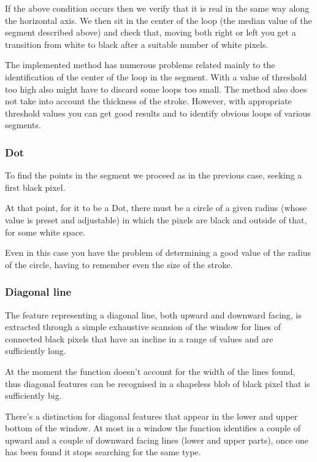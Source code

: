 If the above condition occurs then we verify that it is real in the same way along the horizontal axis. We then sit in the center of the loop (the median value of the segment described above) and check that, moving both right or left you get a transition from white to black after a suitable number of white pixels.

The implemented method has numerous problems related mainly to the identification of the center of the loop in the segment. With a value of threshold too high also might have to discard some loops too small. The method also does not take into account the thickness of the stroke.
However, with appropriate threshold values you can get good results and to identify obvious loops of various segments.

\subsubsection{Dot}

To find the points in the segment we proceed as in the previous case, seeking a first black pixel.

At that point, for it to be a Dot, there must be a circle of a given radius (whose value is preset and adjustable) in which the pixels are black and outside of that, for some white space.

Even in this case you have the problem of determining a good value of the radius of the circle, having to remember even the size of the stroke.

\subsubsection{Diagonal line}

The feature representing a diagonal line, both upward and downward facing, is extracted through a simple exhaustive scansion of the window for lines of connected black pixels that have an incline in a range of values and are sufficiently long.

At the moment the function doesn't account for the width of the lines found, thus diagonal features can be recognised in a shapeless blob of black pixel that is sufficiently big. 
   
There's a distinction for diagonal features that appear in the lower and upper bottom of the window.
At most in a window the function identifies a couple of upward and a couple of downward facing lines (lower and upper parts), once one has been found it stops searching for the same type.

